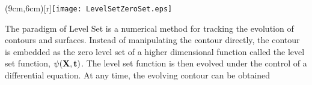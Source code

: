 %
%
% 
%
%
%



\parpic(9cm,6cm)[r]{\texttt{[image: LevelSetZeroSet.eps]}}

The paradigm of Level Set is a numerical method for tracking the evolution of contours and 
surfaces. Instead of manipulating the contour directly, the contour is embedded
as the zero level set of a higher dimensional function called the 
level set function, $\psi(\bf{X},t)$. The level set function is then evolved 
under the control of a differential equation. At any time, the evolving contour can be obtained

